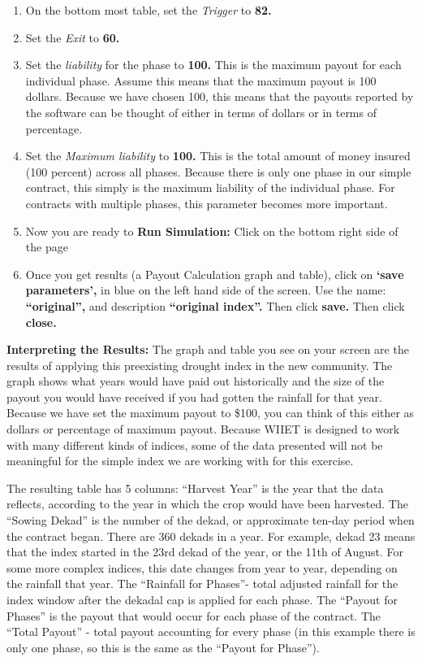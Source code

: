 \documentclass[letterpaper,10pt,english]{sphinxmanual}
\begin{document}
\begin{enumerate}
\item {} 
On the bottom most table, set the \emph{Trigger} to \textbf{82.}

\item {} 
Set the \emph{Exit} to \textbf{60.}

\item {} 
Set the \emph{liability} for the phase to \textbf{100.}  This is the maximum payout for each individual phase.  Assume this means that the maximum payout is 100 dollars.  Because we have chosen 100, this means that the payouts reported by the software can be thought of either in terms of dollars or in terms of percentage.

\item {} 
Set the \emph{Maximum liability} to \textbf{100.} This is the total amount of money insured (100 percent) across all phases.  Because there is only one phase in our simple contract, this simply is the maximum liability of the individual phase.  For contracts with multiple phases, this parameter becomes more important.

\item {} 
Now you are ready to \textbf{Run Simulation:} Click on the bottom right side of the page

\item {} 
Once you get results (a Payout Calculation graph and table), click on \textbf{`save parameters',} in blue on the left hand side of the screen.  Use the name: \textbf{``original'',} and description \textbf{``original index''.} Then click \textbf{save.} Then click \textbf{close.}

\end{enumerate}

\textbf{Interpreting the Results:} The graph and table you see on your screen are the results of applying this preexisting drought index in the new community. The graph shows what years would have paid out historically and the size of the payout you would have received if you had gotten the rainfall for that year. Because we have set the maximum payout to \$100, you can think of this either as dollars or percentage of maximum payout. Because WIIET is designed to work with many different kinds of indices, some of the data presented will not be meaningful for the simple index we are working with for this exercise.

The resulting table has 5 columns: ``Harvest Year'' is the year that the data reflects, according to the year in which the crop would have been harvested. The ``Sowing Dekad'' is the number of the dekad, or approximate ten-day period when the contract began.  There are 360 dekads in a year.  For example, dekad 23 means that the index started in the 23rd dekad of the year, or the 11th of August.  For some more complex indices, this date changes from year to year, depending on the rainfall that year. The ``Rainfall for Phases''- total adjusted rainfall for the index window after the dekadal cap is applied for each phase. The ``Payout for Phases'' is the payout that would occur for each phase of the contract.  The ``Total Payout'' - total payout accounting for every phase (in this example there is only one phase, so this is the same as the ``Payout for Phase'').
\end{document}

